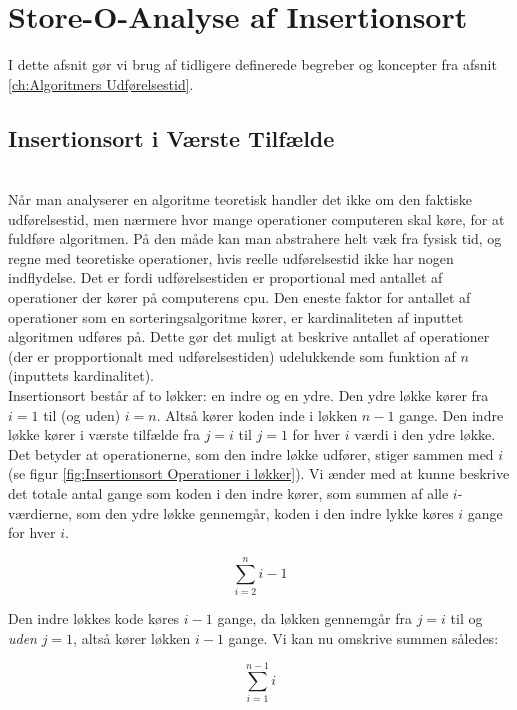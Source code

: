 \section{Store-O-Analyse af Insertionsort}
\label{sec:Analyse af Insertionsort}

I dette afsnit gør vi brug af tidligere definerede begreber og koncepter fra afsnit \ref{ch:Algoritmers Udførelsestid}.

\subsection{Insertionsort i Værste Tilfælde}%
\label{sub:Insertionsort i Værste Tilfælde}


\cite[s. 42]{aogd}\\

Når man analyserer en algoritme teoretisk handler det ikke om den faktiske udførelsestid, men nærmere hvor mange operationer computeren skal køre, for at fuldføre algoritmen. På den måde kan man abstrahere helt væk fra fysisk tid, og regne med teoretiske operationer, hvis reelle udførelsestid ikke har nogen indflydelse. Det er fordi udførelsestiden er proportional med antallet af operationer der kører på computerens cpu. Den eneste faktor for antallet af operationer som en sorteringsalgoritme kører, er kardinaliteten af inputtet algoritmen udføres på. Dette gør det muligt at beskrive antallet af operationer (der er propportionalt med udførelsestiden) udelukkende som funktion af $n$ (inputtets kardinalitet).\\

Insertionsort består af to løkker: en indre og en ydre. Den ydre løkke kører fra $i = 1$ til (og uden) $i = n$. Altså kører koden inde i løkken $n - 1$ gange. Den indre løkke kører i værste tilfælde fra $j = i$ til $j = 1$ for hver $i$ værdi i den ydre løkke. Det betyder at operationerne, som den indre løkke udfører, stiger sammen med $i$ (se figur \ref{fig:Insertionsort Operationer i løkker}). Vi ænder med at kunne beskrive det totale antal gange som koden i den indre kører, som summen af alle $i$-værdierne, som den ydre løkke gennemgår, koden i den indre lykke køres $i$ gange for hver $i$.

$$\sum_{i=2}^{n}i-1$$

Den indre løkkes kode køres $i-1$ gange, da løkken gennemgår fra $j=i$ til og \emph{uden} $j=1$, altså kører løkken $i-1$ gange. Vi kan nu omskrive summen således:

$$\sum_{i=1}^{n-1}i$$

